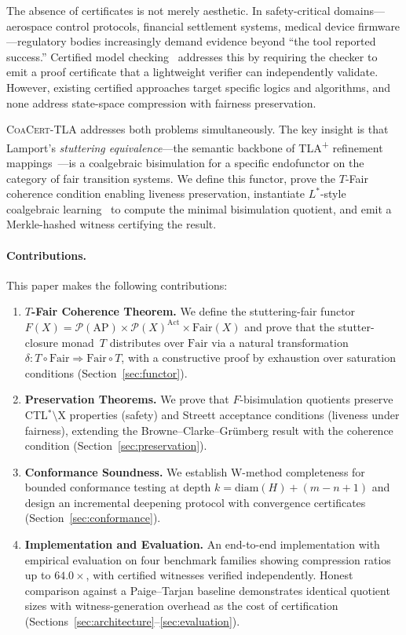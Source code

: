 \documentclass[11pt]{article}
\newcommand{\Pow}{\mathcal{P}}
\newcommand{\Fair}{\ensuremath{\mathrm{Fair}}}
\newcommand{\Act}{\ensuremath{\mathrm{Act}}}
\newcommand{\AP}{\ensuremath{\mathrm{AP}}}
\newcommand{\TFair}{$T$-Fair}
\newcommand{\CoaCert}{\textsc{CoaCert-TLA}}
\newcommand{\TLAplus}{TLA\textsuperscript{+}}
\newcommand{\diam}{\ensuremath{\mathrm{diam}}}
\begin{document}
The absence of certificates is not merely aesthetic.
In safety-critical domains---aerospace control protocols, financial
settlement systems, medical device firmware---regulatory bodies increasingly
demand evidence beyond ``the tool reported success.''
Certified model checking~\cite{Namjoshi01} addresses this by requiring the
checker to emit a proof certificate that a lightweight verifier can
independently validate.
However, existing certified approaches target specific logics and algorithms,
and none address state-space compression with fairness preservation.

\CoaCert{} addresses both problems simultaneously.
The key insight is that Lamport's \emph{stuttering equivalence}---the
semantic backbone of \TLAplus{} refinement mappings~\cite{Lamport94}---is
a coalgebraic bisimulation for a specific endofunctor on the category of
fair transition systems.
We define this functor, prove the \TFair{} coherence condition enabling
liveness preservation, instantiate $L^*$-style coalgebraic
learning~\cite{BarloccoKR19} to compute the minimal bisimulation quotient,
and emit a Merkle-hashed witness certifying the result.

\paragraph{Contributions.}
This paper makes the following contributions:
\begin{enumerate}[nosep]
\item \textbf{\TFair{} Coherence Theorem.}
  We define the stuttering-fair functor
  $F(X) = \Pow(\AP) \times \Pow(X)^{\Act} \times \Fair(X)$
  and prove that the stutter-closure monad~$T$ distributes over $\Fair$
  via a natural transformation
  $\delta : T \circ \Fair \Rightarrow \Fair \circ T$,
  with a constructive proof by exhaustion over saturation conditions
  (Section~\ref{sec:functor}).

\item \textbf{Preservation Theorems.}
  We prove that $F$-bisimulation quotients preserve CTL$^*$$\setminus$X
  properties (safety) and Streett acceptance conditions (liveness under
  fairness), extending the Browne--Clarke--Gr\"umberg result with the
  coherence condition (Section~\ref{sec:preservation}).

\item \textbf{Conformance Soundness.}
  We establish W-method completeness for bounded conformance testing at
  depth $k = \diam(H) + (m - n + 1)$ and design an incremental deepening
  protocol with convergence certificates
  (Section~\ref{sec:conformance}).

\item \textbf{Implementation and Evaluation.}
  An end-to-end implementation with empirical evaluation on four
  benchmark families showing compression ratios up to $64.0\times$,
  with certified witnesses verified independently.
  Honest comparison against a Paige--Tarjan baseline demonstrates
  identical quotient sizes with witness-generation overhead as the cost
  of certification (Sections~\ref{sec:architecture}--\ref{sec:evaluation}).
\end{enumerate}
\end{document}
